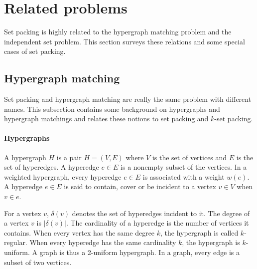 

\section{Related problems}\label{sec:RelatedProblems}

Set packing is highly related to the hypergraph matching problem and the independent set problem. This section surveys these relations and some special cases of set packing.

\subsection{Hypergraph matching}\label{subsec:Hypergraphs}

Set packing and hypergraph matching are really the same problem with different names. This subsection contains some background on hypergraphs and hypergraph matchings and relates these notions to set packing and $k$-set packing.

\paragraph{Hypergraphs} A hypergraph $H$ is a pair $H=(V,E)$ where $V$ is the set of vertices and $E$ is the set of hyperedges. A hyperedge $e \in E$ is a nonempty subset of the vertices. In a weighted hypergraph, every hyperedge $e \in E$ is associated with a weight $w(e)$. A hyperedge $e \in E$ is said to contain, cover or be incident to a vertex $v \in V$ when $v \in e$.

For a vertex $v$, $\delta(v)$ denotes the set of hyperedges incident to it. The degree of a vertex $v$ is $|\delta(v)|$. %
The cardinality of a hyperedge is the number of vertices it contains. When every vertex has the same degree $k$, the hypergraph is called $k$-regular. When every hyperedge has the same cardinality $k$, the hypergraph is $k$-uniform. A graph is thus a 2-uniform hypergraph. In a graph, every edge is a subset of two vertices.

